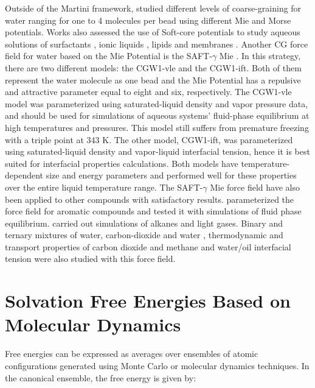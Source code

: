 Outside of the Martini framework,  studied different levels of coarse-graining for water ranging for one to 4 molecules per bead using different Mie and Morse potentials. Works also assessed the use of Soft-core potentials to study aqueous solutions of surfactants \cite{shinoda2007}, ionic liquids \cite{bhargava2009}, lipids \cite{shinoda20102} and membranes \cite{pantano2009}. Another CG force field for water based on the Mie Potential is the SAFT-$\gamma$ Mie \cite{lobanova2015}. In this strategy, there are two different models: the CGW1-vle and the CGW1-ift. Both of them represent the water molecule as one bead and  the Mie Potential has a repulsive and attractive parameter equal to eight and six, respectively. The CGW1-vle model was parameterized using saturated-liquid density and vapor pressure data, and should be used for simulations of aqueous systems' fluid-phase equilibrium at high temperatures and pressures. This model still suffers from premature freezing with a triple point at 343 K. The other model, CGW1-ift, was parameterized using saturated-liquid density and vapor-liquid interfacial tension, hence it is best suited for interfacial properties calculations. Both models have temperature-dependent size and energy parameters and performed well for these properties over the entire liquid temperature range. The SAFT-$\gamma$ Mie force field have also been applied to other compounds with satisfactory results.  parameterized the force field for aromatic compounds and tested it with simulations of fluid phase equilibrium.  carried out simulations of alkanes and light gases. Binary and ternary mixtures of water, carbon-dioxide and water \cite{lobanova2016}, thermodynamic and transport properties of carbon dioxide and methane \cite{cassiano1,cassiano2} and water/oil interfacial tension \cite{herdes2017} were also studied with this force field.  






\section{Solvation Free Energies Based on Molecular Dynamics}

Free energies can be expressed as averages over ensembles of atomic configurations generated using Monte Carlo or molecular dynamics techniques. In the canonical ensemble, the free energy is given by:  

